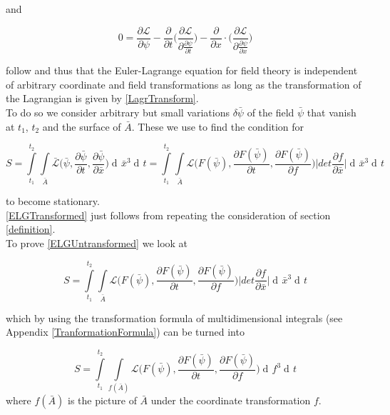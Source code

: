 \documentclass{article}
\DeclareMathOperator{\dd}{d\!}
\begin{document}
and

\begin{equation} \label{ELGUntransformed}
0 = \frac{\partial \mathcal{L}}{\partial \psi}
-\frac{\partial}{\partial t} \bigg( \frac{\partial \mathcal{L}}{\partial \frac{\partial \psi}{\partial t}} \bigg) 
-\frac{\partial}{\partial x} \cdot \bigg( \frac{\partial \mathcal{L}}{\partial \frac{\partial \psi}{\partial x}} \bigg) 
\end{equation}

follow and thus that the Euler-Lagrange equation for field theory is independent of arbitrary coordinate and field transformations as long as the transformation of the Lagrangian is given by \ref{LagrTransform}. \\

To do so we consider arbitrary but small variations $\delta \bar{\psi}$ of the field $\bar{\psi}$ that vanish at $t_1$, $t_2$ and the surface of $\bar{A}$. These we use to find the condition for  

\begin{equation}
S = \int\limits_{t_1}^{t_2} \int\limits_{\bar{A}} \bar{\mathcal{L}}\bigg(\bar{\psi}, \frac{\partial \bar{\psi}}{\partial t}, \frac{\partial \bar{\psi}}{\partial \bar{x}}\bigg) \dd \bar{x}^3 \dd t 
= \int\limits_{t_1}^{t_2} \int\limits_{\bar{A}} \mathcal{L}\bigg(F(\bar{\psi}), \frac{\partial F(\bar{\psi})}{\partial t}, \frac{\partial F(\bar{\psi})}{\partial f}\bigg) 
\bigg| det \frac{\partial f}{\partial \bar{x}} \bigg| \dd \bar{x}^3 \dd t 
\end{equation}

to become stationary. \\

\ref{ELGTransformed} just follows from repeating the consideration of section \ref{definition}. \\

To prove \ref{ELGUntransformed} we look at 

\begin{equation}
S = \int\limits_{t_1}^{t_2} \int\limits_{\bar{A}} \mathcal{L}\bigg(F(\bar{\psi}), \frac{\partial F(\bar{\psi})}{\partial t}, \frac{\partial F(\bar{\psi})}{\partial f}\bigg) 
\bigg| det \frac{\partial f}{\partial \bar{x}} \bigg| \dd \bar{x}^3 \dd t 
\end{equation}

which by using the transformation formula of multidimensional integrals (see Appendix \ref{TranformationFormula}) can be turned into

\begin{equation}
S = \int\limits_{t_1}^{t_2} \int\limits_{f(\bar{A})} \mathcal{L}\bigg(F(\bar{\psi}), \frac{\partial F(\bar{\psi})}{\partial t}, \frac{\partial F(\bar{\psi})}{\partial f}\bigg) 
\dd f^3 \dd t 
\end{equation}
where $f(\bar{A})$ is the picture of $\bar{A}$ under the coordinate transformation $f$.
\end{document}
